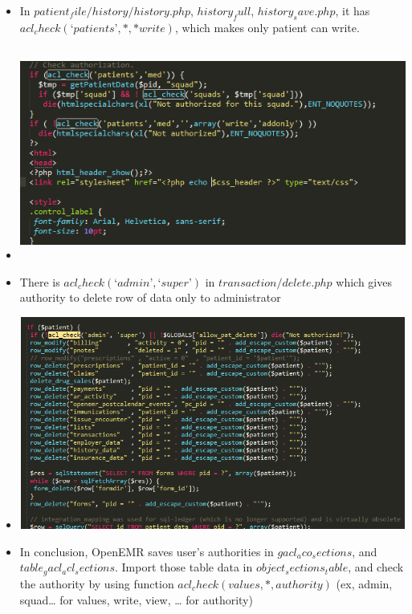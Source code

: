 \documentclass[paper=a4, fontsize=11pt]{scrartcl} %
\numberwithin{equation}{section} %
\numberwithin{figure}{section} %
\numberwithin{table}{section} %
\begin{document}
\begin{itemize}
		\item In $patient_file/history/history.php$, $history_full$, $history_save.php$, it has $acl_check(‘patients’, *, * write)$, which makes only patient can write.
		\item
		\includegraphics[width = 20cm, height=7cm]{pictures/6thaclcheck.png}
		\item There is $acl_check(‘admin’, ‘super’)$ in $transaction/delete.php$ which gives authority to delete row of data only to administrator
		\item
		\includegraphics[width = 20cm, height=7cm]{pictures/7thaclcheck.png}
		\item In conclusion, OpenEMR saves user’s authorities in $gacl_aco_sections$, and $table_gacl_acl_sections$. Import those table data in $object_sections_table$, and check the authority by using function $acl_check(values, *, authority)$ (ex, admin, squad… for values, write, view, … for authority)







				
\end{itemize}
\end{document}
